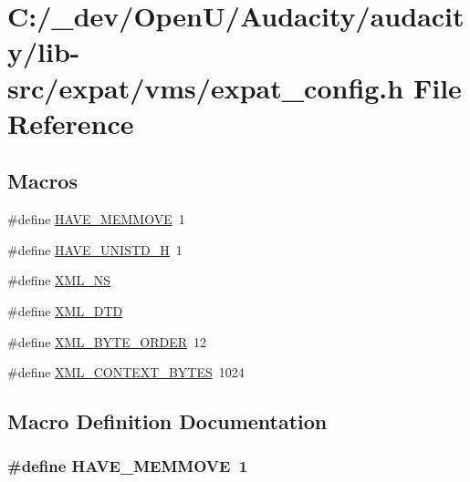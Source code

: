 \hypertarget{lib-src_2expat_2vms_2expat__config_8h}{}\section{C\+:/\+\_\+dev/\+Open\+U/\+Audacity/audacity/lib-\/src/expat/vms/expat\+\_\+config.h File Reference}
\label{lib-src_2expat_2vms_2expat__config_8h}
\subsection*{Macros}
\begin{DoxyCompactItemize}
\item 
\#define \hyperlink{lib-src_2expat_2vms_2expat__config_8h_a7b300f836d3d79d0d9b0039a6b842ded}{H\+A\+V\+E\+\_\+\+M\+E\+M\+M\+O\+VE}~1
\item 
\#define \hyperlink{lib-src_2expat_2vms_2expat__config_8h_a219b06937831d0da94d801ab13987639}{H\+A\+V\+E\+\_\+\+U\+N\+I\+S\+T\+D\+\_\+H}~1
\item 
\#define \hyperlink{lib-src_2expat_2vms_2expat__config_8h_a347a28734ff1f6fedce04d73db636fea}{X\+M\+L\+\_\+\+NS}
\item 
\#define \hyperlink{lib-src_2expat_2vms_2expat__config_8h_ac409db9803f37ad283a5096960d3d59e}{X\+M\+L\+\_\+\+D\+TD}
\item 
\#define \hyperlink{lib-src_2expat_2vms_2expat__config_8h_a5df6d8f8f45c567a22d265b2a154f8a8}{X\+M\+L\+\_\+\+B\+Y\+T\+E\+\_\+\+O\+R\+D\+ER}~12
\item 
\#define \hyperlink{lib-src_2expat_2vms_2expat__config_8h_a2116a8741d7cbc537ea200671a959b76}{X\+M\+L\+\_\+\+C\+O\+N\+T\+E\+X\+T\+\_\+\+B\+Y\+T\+ES}~1024
\end{DoxyCompactItemize}


\subsection{Macro Definition Documentation}
\subsubsection[{\texorpdfstring{H\+A\+V\+E\+\_\+\+M\+E\+M\+M\+O\+VE}{HAVE_MEMMOVE}}]{\setlength{\rightskip}{0pt plus 5cm}\#define H\+A\+V\+E\+\_\+\+M\+E\+M\+M\+O\+VE~1}\hypertarget{lib-src_2expat_2vms_2expat__config_8h_a7b300f836d3d79d0d9b0039a6b842ded}{}\label{lib-src_2expat_2vms_2expat__config_8h_a7b300f836d3d79d0d9b0039a6b842ded}


